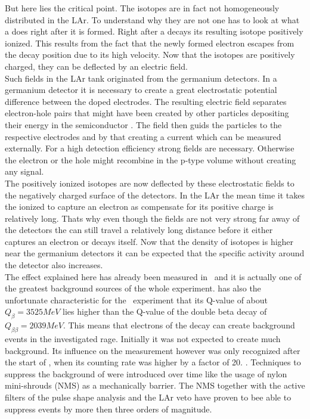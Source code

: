 But here lies the critical point.
The  isotopes are in fact not homogeneously distributed in the LAr.
To understand why they are not one has to look at what a  does right after it is formed.
Right after a  decays its resulting  isotope positively ionized.
This results from the fact that the newly formed electron escapes from the decay position due to its high velocity.
Now that the  isotopes are positively charged, they can be deflected by an electric field.
\\

Such fields in the LAr tank originated from the germanium detectors.
In a germanium detector it is necessary to create a great electrostatic potential difference between the doped electrodes.
The resulting electric field separates electron-hole pairs that might have been created by other particles depositing their energy in the semiconductor \cite{spieler_semiconductor_2005}.
The field then guids the particles to the respective electrodes and by that creating a current which can be measured externally.
For a high detection efficiency strong fields are necessary.
Otherwise the electron or the hole might recombine in the p-type volume without creating any signal.
\\

The positively ionized isotopes are now deflected by these electrostatic fields to the negatively charged surface of the detectors. 
In the LAr the mean time it takes the ionized  to capture an electron as compensate for its positive charge is relatively long. 
Thats why even though the fields are not very strong far away of the detectors the  can still travel a relatively long distance before it either captures an electron or decays itself. 
Now that the density of  isotopes is higher near the germanium detectors it can be expected that the specific activity around the detector also increases.
\\

The effect explained here has already been measured in \gerda\ and it is actually one of the greatest background sources of the whole experiment.
 has also the unfortunate characteristic for the \gerda\ experiment that its Q-value of about $Q_\beta =3525\unit{MeV}$ lies higher than the Q-value of the double beta decay of  $Q_{\beta \beta} = 2039\unit{MeV}$.
This means that electrons of the  decay can create background events in the investigated rage. 
Initially it was not expected to create much background.
Its influence on the measurement however was only recognized after the start of \PI, when its counting rate was higher by a factor of 20. \cite{becerici_schmidt_results_2014}.
Techniques to suppress the background of  were introduced over time like the usage of nylon mini-shrouds (NMS) as a mechanically barrier.
The NMS together with the active filters of the pulse shape analysis and the LAr veto have proven to bee able to suppress  events by more then three orders of magnitude.
\\


